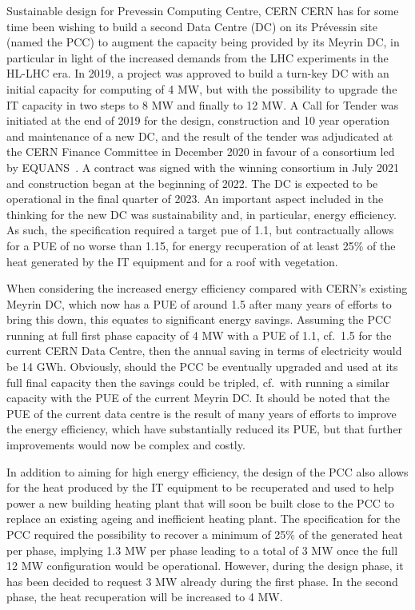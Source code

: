 \documentclass[../SustainableHEP.tex]{subfiles}
\begin{document}
\begin{bestpractice}{Sustainable design for Prevessin Computing Centre, CERN}%
CERN has for some time been wishing to build a second Data Centre (DC) on its Pr\'{e}vessin site (named the PCC) to augment the capacity being provided by its Meyrin DC, in particular in light of the increased demands from the LHC experiments in the HL-LHC era.
In 2019, a project was approved to build a turn-key DC with an initial capacity for computing of 4 MW, but with the possibility to upgrade the IT capacity in two steps to 8 MW and finally to 12 MW. 
A Call for Tender was initiated at the end of 2019 for the design, construction and 10 year operation and
maintenance of a new DC, and the result of the tender was
adjudicated at the CERN Finance Committee in December 2020 in favour of a consortium led by EQUANS~\cite{EQUANS}. A contract was signed with the winning
consortium in July 2021 and construction began at the beginning of 2022.
The DC is expected to be operational in the final quarter of 2023. An
important aspect included in the thinking for the new DC was
sustainability and, in particular, energy efficiency. As such, the
specification required a target \acrshort{pue} of 1.1,
but contractually allows for a PUE of no worse than 1.15, for energy
recuperation of at least 25\% of the heat generated by the IT equipment
and for a roof with vegetation.

When considering the increased energy efficiency compared with CERN's
existing Meyrin DC, which now has a PUE of around 1.5 after
many years of efforts to bring this down, this equates to significant
energy savings. Assuming the PCC running at full first phase capacity of
4 MW with a PUE of 1.1, cf.~1.5 for the current CERN Data Centre, then
the annual saving in terms of electricity would be 14 GWh. Obviously,
should the PCC be eventually upgraded and used at its full final
capacity then the savings could be tripled, cf.~with running a similar
capacity with the PUE of the current Meyrin DC. It should be
noted that the PUE of the current data centre is the result of many
years of efforts to improve the energy efficiency, which have
substantially reduced its PUE, but that further improvements would now
be complex and costly.

In addition to aiming for high energy efficiency, the design of the PCC
also allows for the heat produced by the IT equipment to be recuperated
and used to help power a new building heating plant that will soon be
built close to the PCC to replace an existing ageing and inefficient
heating plant. 
The specification for the PCC required the possibility
to recover a minimum of 25\% of the generated heat per phase, implying
1.3 MW per phase leading to a total of 3 MW once the full 12 MW
configuration would be operational. However, during the design phase, it
has been decided to request 3 MW already during the first phase. In the
second phase, the heat recuperation will be increased to 4 MW.


\end{bestpractice}
\end{document}
